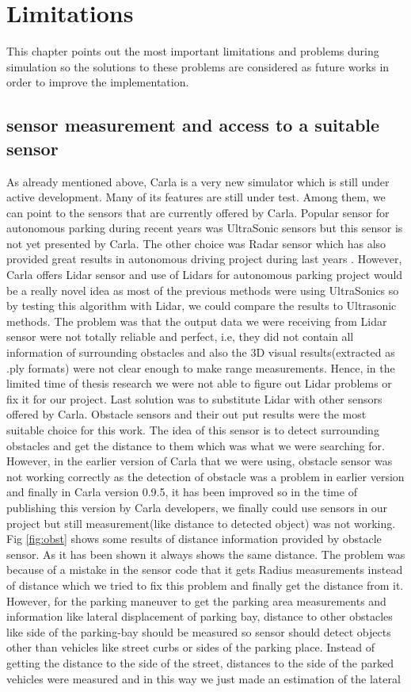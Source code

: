 \chapter{Limitations}\label{chapter:limitations}
This chapter points out the most important limitations and problems during simulation so the solutions to these problems are considered as future works in order to improve the implementation.
\section{sensor measurement and access to a suitable sensor}
As already mentioned above, Carla is a very new simulator which is still under active development. Many of its features are still under test. Among them, we can point to the sensors that are currently offered by Carla. Popular sensor for autonomous parking during recent years was UltraSonic sensors \cite{UltraSonic} but this sensor is not yet presented by Carla. The other choice was Radar sensor which has also provided great results in autonomous driving project during last years \cite{Radar}. However, Carla offers Lidar sensor and use of Lidars for autonomous parking project would be a really novel idea as most of the previous methods were using UltraSonics so by testing this algorithm with Lidar, we could compare the results to Ultrasonic methods. The problem was that the output data we were receiving from Lidar sensor were not totally reliable and perfect, i.e, they did not contain all information of surrounding obstacles and also the 3D visual results(extracted as .ply formats) were not clear enough to make range measurements. Hence, in the limited time of thesis research we were not able to figure out Lidar problems or fix it for our project. Last solution was to substitute Lidar with other sensors offered by Carla. Obstacle sensors and their out put results were the most suitable choice for this work. The idea of this sensor is to detect surrounding obstacles and get the distance to them which was what we were searching for. However, in the earlier version of Carla that we were using, obstacle sensor was not working correctly as the detection of obstacle was a problem in earlier version and finally in Carla version 0.9.5, it has been improved so in the time of publishing this version by Carla developers, we finally could use sensors in our project but still measurement(like distance to detected object) was not working. Fig \ref{fig:obst} shows some results of distance information provided by obstacle sensor. As it has been shown it always shows the same distance. The problem was because of a mistake in the sensor code that it gets Radius measurements instead of distance which we tried to fix this problem and finally get the distance  from it. However, for the parking maneuver to get the parking area measurements and information like lateral displacement of parking bay, distance to other obstacles like side of the parking-bay should be measured so sensor should detect objects other than vehicles like street curbs or sides of the parking place. Instead of getting the distance to the side of the street, distances to the side of the parked vehicles were measured and in this way we just made an estimation of the lateral 